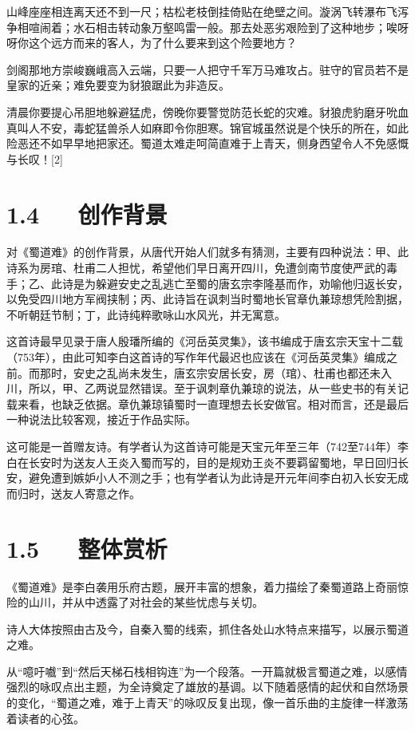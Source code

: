 \documentclass[letterpaper,10pt,english]{sphinxmanual}
\begin{document}
山峰座座相连离天还不到一尺；枯松老枝倒挂倚贴在绝壁之间。漩涡飞转瀑布飞泻争相喧闹着；水石相击转动象万壑鸣雷一般。那去处恶劣艰险到了这种地步；唉呀呀你这个远方而来的客人，为了什么要来到这个险要地方？

剑阁那地方崇峻巍峨高入云端，只要一人把守千军万马难攻占。驻守的官员若不是皇家的近亲；难免要变为豺狼踞此为非造反。

清晨你要提心吊胆地躲避猛虎，傍晚你要警觉防范长蛇的灾难。豺狼虎豹磨牙吮血真叫人不安，毒蛇猛兽杀人如麻即令你胆寒。锦官城虽然说是个快乐的所在，如此险恶还不如早早地把家还。蜀道太难走呵简直难于上青天，侧身西望令人不免感慨与长叹！{[}2{]}


\section{1.4   创作背景}
\label{\detokenize{p01_u6563_u6587/_u674e_u767d-_u8700_u9053_u96be:id6}}
对《蜀道难》的创作背景，从唐代开始人们就多有猜测，主要有四种说法：甲、此诗系为房琯、杜甫二人担忧，希望他们早日离开四川，免遭剑南节度使严武的毒手；乙、此诗是为躲避安史之乱逃亡至蜀的唐玄宗李隆基而作，劝喻他归返长安，以免受四川地方军阀挟制；丙、此诗旨在讽刺当时蜀地长官章仇兼琼想凭险割据，不听朝廷节制；丁，此诗纯粹歌咏山水风光，并无寓意。

这首诗最早见录于唐人殷璠所编的《河岳英灵集》，该书编成于唐玄宗天宝十二载（753年），由此可知李白这首诗的写作年代最迟也应该在《河岳英灵集》编成之前。而那时，安史之乱尚未发生，唐玄宗安居长安，房（琯）、杜甫也都还未入川，所以，甲、乙两说显然错误。至于讽刺章仇兼琼的说法，从一些史书的有关记载来看，也缺乏依据。章仇兼琼镇蜀时一直理想去长安做官。相对而言，还是最后一种说法比较客观，接近于作品实际。

这可能是一首赠友诗。有学者认为这首诗可能是天宝元年至三年（742至744年）李白在长安时为送友人王炎入蜀而写的，目的是规劝王炎不要羁留蜀地，早日回归长安，避免遭到嫉妒小人不测之手；也有学者认为此诗是开元年间李白初入长安无成而归时，送友人寄意之作。


\section{1.5   整体赏析}
\label{\detokenize{p01_u6563_u6587/_u674e_u767d-_u8700_u9053_u96be:id7}}
《蜀道难》是李白袭用乐府古题，展开丰富的想象，着力描绘了秦蜀道路上奇丽惊险的山川，并从中透露了对社会的某些忧虑与关切。

诗人大体按照由古及今，自秦入蜀的线索，抓住各处山水特点来描写，以展示蜀道之难。

从“噫吁嚱”到“然后天梯石栈相钩连”为一个段落。一开篇就极言蜀道之难，以感情强烈的咏叹点出主题，为全诗奠定了雄放的基调。以下随着感情的起伏和自然场景的变化，“蜀道之难，难于上青天”的咏叹反复出现，像一首乐曲的主旋律一样激荡着读者的心弦。
\end{document}
